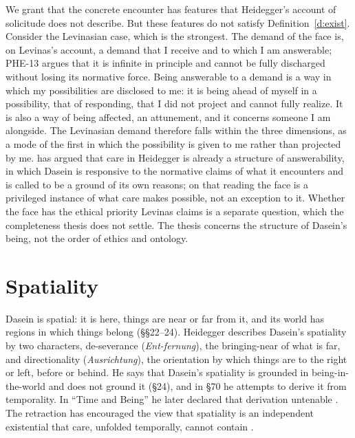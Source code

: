 \documentclass{situationist-preprint}
\begin{document}
We grant that the concrete encounter has features that Heidegger's account of solicitude does not describe. But these features do not satisfy Definition~\ref{d:exist}. Consider the Levinasian case, which is the strongest. The demand of the face is, on Levinas's account, a demand that I receive and to which I am answerable; PHE-13 argues that it is infinite in principle and cannot be fully discharged without losing its normative force. Being answerable to a demand is a way in which my possibilities are disclosed to me: it is being ahead of myself in a possibility, that of responding, that I did not project and cannot fully realize. It is also a way of being affected, an attunement, and it concerns someone I am alongside. The Levinasian demand therefore falls within the three dimensions, as a mode of the first in which the possibility is given to me rather than projected by me. \citet{Crowell2013} has argued that care in Heidegger is already a structure of answerability, in which Dasein is responsive to the normative claims of what it encounters and is called to be a ground of its own reasons; on that reading the face is a privileged instance of what care makes possible, not an exception to it. Whether the face has the ethical priority Levinas claims is a separate question, which the completeness thesis does not settle. The thesis concerns the structure of Dasein's being, not the order of ethics and ontology.

\section{Spatiality}\label{s:space}

Dasein is spatial: it is here, things are near or far from it, and its world has regions in which things belong (\S\S22--24). Heidegger describes Dasein's spatiality by two characters, de-severance (\emph{Ent-fernung}), the bringing-near of what is far, and directionality (\emph{Ausrichtung}), the orientation by which things are to the right or left, before or behind. He says that Dasein's spatiality is grounded in being-in-the-world and does not ground it (\S24), and in \S70 he attempts to derive it from temporality. In \enquote{Time and Being} he later declared that derivation untenable \citep{Heidegger1969}. The retraction has encouraged the view that spatiality is an independent existential that care, unfolded temporally, cannot contain \citep{Malpas2006}.
\end{document}
